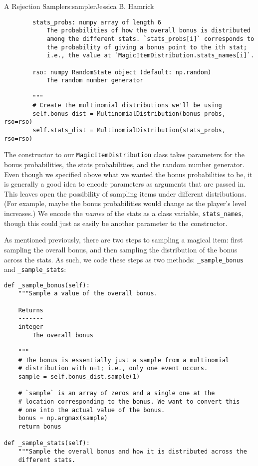 \begin{aosachapter}{A Rejection Sampler}{s:sampler}{Jessica B. Hamrick}
\begin{verbatim}
        stats_probs: numpy array of length 6
            The probabilities of how the overall bonus is distributed
            among the different stats. `stats_probs[i]` corresponds to
            the probability of giving a bonus point to the ith stat;
            i.e., the value at `MagicItemDistribution.stats_names[i]`.

        rso: numpy RandomState object (default: np.random)
            The random number generator

        """
        # Create the multinomial distributions we'll be using
        self.bonus_dist = MultinomialDistribution(bonus_probs, rso=rso)
        self.stats_dist = MultinomialDistribution(stats_probs, rso=rso)
\end{verbatim}

The constructor to our \texttt{MagicItemDistribution} class takes
parameters for the bonus probabilities, the stats probabilities, and the
random number generator. Even though we specified above what we wanted
the bonus probabilities to be, it is generally a good idea to encode
parameters as arguments that are passed in. This leaves open the
possibility of sampling items under different distributions. (For
example, maybe the bonus probabilities would change as the player's
level increases.) We encode the \emph{names} of the stats as a class
variable, \texttt{stats\_names}, though this could just as easily be
another parameter to the constructor.

As mentioned previously, there are two steps to sampling a magical item:
first sampling the overall bonus, and then sampling the distribution of
the bonus across the stats. As such, we code these steps as two methods:
\texttt{\_sample\_bonus} and \texttt{\_sample\_stats}:

\begin{verbatim}
def _sample_bonus(self):
    """Sample a value of the overall bonus.

    Returns
    -------
    integer
        The overall bonus

    """
    # The bonus is essentially just a sample from a multinomial
    # distribution with n=1; i.e., only one event occurs.
    sample = self.bonus_dist.sample(1)

    # `sample` is an array of zeros and a single one at the
    # location corresponding to the bonus. We want to convert this
    # one into the actual value of the bonus.
    bonus = np.argmax(sample)
    return bonus

def _sample_stats(self):
    """Sample the overall bonus and how it is distributed across the
    different stats.


\end{verbatim}
\end{aosachapter}

